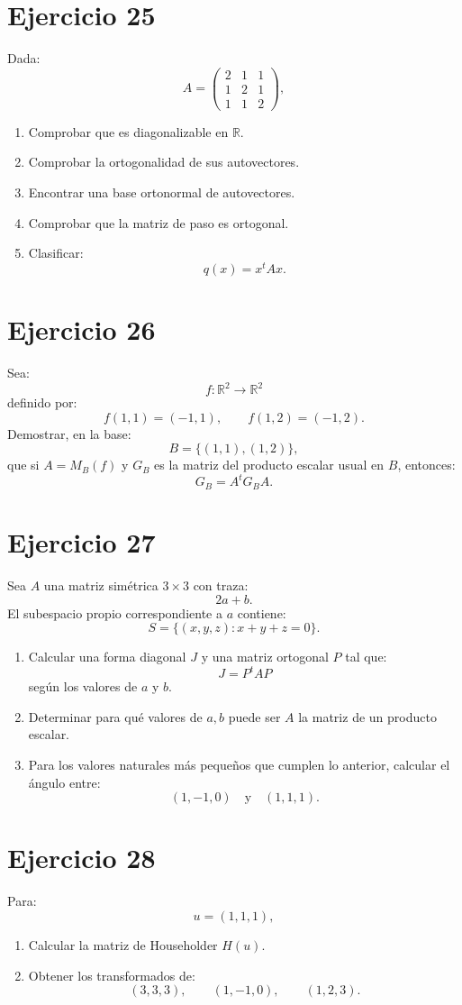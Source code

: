 \documentclass[11pt,a4paper]{article}
\newcommand{\R}{\mathbb{R}}
\begin{document}
\section{Ejercicio 25}
Dada:
\[
A=
\begin{pmatrix}
2&1&1\\
1&2&1\\
1&1&2
\end{pmatrix},
\]
\begin{enumerate}[label=\alph*)]
\item Comprobar que es diagonalizable en $\R$.
\item Comprobar la ortogonalidad de sus autovectores.
\item Encontrar una base ortonormal de autovectores.
\item Comprobar que la matriz de paso es ortogonal.
\item Clasificar:
\[
q(x)=x^tAx.
\]
\end{enumerate}

\section{Ejercicio 26}
Sea:
\[
f:\R^2\to\R^2
\]
definido por:
\[
f(1,1)=(-1,1),
\qquad
f(1,2)=(-1,2).
\]
Demostrar, en la base:
\[
B=\{(1,1),(1,2)\},
\]
que si $A=M_B(f)$ y $G_B$ es la matriz del producto escalar usual en $B$, entonces:
\[
G_B=A^tG_BA.
\]

\section{Ejercicio 27}
Sea $A$ una matriz simétrica $3\times3$ con traza:
\[
2a+b.
\]
El subespacio propio correspondiente a $a$ contiene:
\[
S=\{(x,y,z):x+y+z=0\}.
\]
\begin{enumerate}[label=\alph*)]
\item Calcular una forma diagonal $J$ y una matriz ortogonal $P$ tal que:
\[
J=P^tAP
\]
según los valores de $a$ y $b$.
\item Determinar para qué valores de $a,b$ puede ser $A$ la matriz de un producto escalar.
\item Para los valores naturales más pequeños que cumplen lo anterior, calcular el ángulo entre:
\[
(1,-1,0)
\quad\text{y}\quad
(1,1,1).
\]
\end{enumerate}

\section{Ejercicio 28}
Para:
\[
u=(1,1,1),
\]
\begin{enumerate}[label=\alph*)]
\item Calcular la matriz de Householder $H(u)$.
\item Obtener los transformados de:
\[
(3,3,3),\qquad
(1,-1,0),\qquad
(1,2,3).
\]
\end{enumerate}
\end{document}
